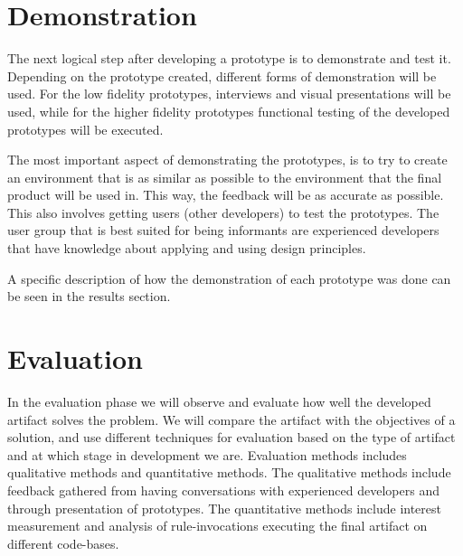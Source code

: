 \documentclass[pdftex,10pt,b5paper,twoside]{report}
\begin{document}
\section{Demonstration}

The next logical step after developing a prototype is to demonstrate and test it. Depending on the prototype created, different forms of demonstration will be used. For the low fidelity prototypes, interviews and visual presentations will be used, while for the higher fidelity prototypes functional testing of the developed prototypes will be executed. 

The most important aspect of demonstrating the prototypes, is to try to create an environment that is as similar as possible to the environment that the final product will be used in. This way, the feedback will be as accurate as possible. This also involves getting users (other developers) to test the prototypes. The user group that is best suited for being informants are experienced developers that have knowledge about applying and using design principles.



A specific description of how the demonstration of each prototype was done can be seen in the results section.

 
\section{Evaluation}
In the evaluation phase we will observe and evaluate how well the developed artifact solves the problem. We will compare the artifact with the objectives of a solution, and use different techniques for evaluation based on the type of artifact and at which stage in development we are. Evaluation methods includes qualitative methods and quantitative methods. The qualitative methods include feedback gathered from having conversations with experienced developers and through presentation of prototypes. The quantitative methods include interest measurement and analysis of rule-invocations executing the final artifact on different code-bases.  
\end{document}
